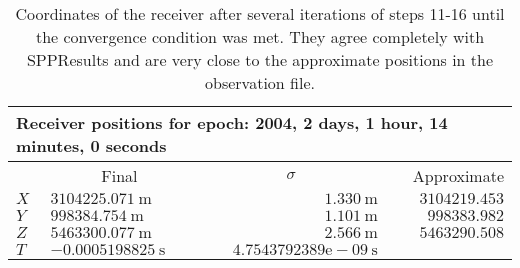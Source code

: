 \begin{table}[htbp]
	\begin{center}
		\begin{tabular}{llrr}
		\toprule
		\multicolumn{4}{l}{Receiver positions for epoch: 2004, 2 days, 1 hour, 14 minutes, 0 seconds} \\ \midrule
		& \multicolumn{1}{c}{Final} & \multicolumn{1}{c}{$\sigma$}  & \multicolumn{1}{r}{Approximate} \\
		\cmidrule(r){1-4} 
			$X$ & $ 3104225.071~\text{m}$	 & $1.330~\text{m}$						&$3104219.453$\\
			$Y$ & $ 998384.754~\text{m}$	 & $1.101~\text{m}$						&$998383.982$ \\
			$Z$ & $ 5463300.077~\text{m}$	 & $2.566~\text{m}$						&$5463290.508$\\
			$T$ & $ -0.0005198825~\text{s}$  & $4.7543792389\text{e}-09~\text{s}$	& 			  	\\
		\bottomrule
		\end{tabular}
	\end{center}
	\caption{Coordinates of the receiver after several iterations of steps 11-16 until the convergence condition was met.  They agree completely with SPPResults and are very close to the approximate positions in the observation file.}
	\label{tab:receiverCoordinates}
\end{table}